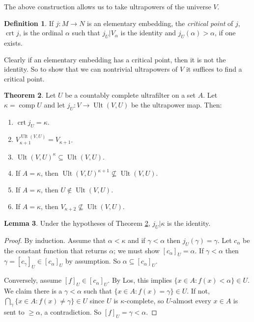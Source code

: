 \documentclass[12pt]{report}
\DeclareMathOperator{\comp}{comp}
\DeclareMathOperator{\crt}{crt}
\DeclareMathOperator{\Ult}{Ult}
\newcommand{\dfn}[1]{\emph{#1}\index{#1}}
\theoremstyle{definition}
\newtheorem{theorem}{Theorem}[chapter]
\newtheorem{lemma}[theorem]{Lemma}
\newtheorem{definition}[theorem]{Definition}
\begin{document}
The above construction allows us to take ultrapowers of the universe $V$.
\begin{definition}
If $j: M \to N$ is an elementary embedding, the \dfn{critical point} of $j$, $\crt j$, is the ordinal $\alpha$ such that $j_U|V_\alpha$ is the identity and $j_U(\alpha) > \alpha$, if one exists.
\end{definition}
Clearly if an elementary embedding has a critical point, then it is not the identity. So to show that we can nontrivial ultrapowers of $V$ it suffices to find a critical point.
\begin{theorem}
\label{critical point is a measurable cardinal}
Let $U$ be a countably complete ultrafilter on a set $A$. Let $\kappa = \comp U$ and let $j_U: V \to \Ult(V, U)$ be the ultrapower map. Then:
\begin{enumerate}
\item $\crt j_U = \kappa$.
\item $V_{\kappa + 1}^{\Ult(V, U)} = V_{\kappa + 1}$.
\item $\Ult(V, U)^\kappa \subseteq \Ult(V, U)$.
\item If $A = \kappa$, then $\Ult(V, U)^{\kappa + 1} \not \subseteq \Ult(V, U)$.
\item If $A = \kappa$, then $U \notin \Ult(V, U)$.
\item If $A = \kappa$, then $V_{\kappa + 2} \not \subseteq \Ult(V, U)$.
\end{enumerate}
\end{theorem}
\begin{lemma}
Under the hypotheses of Theorem \ref{critical point is a measurable cardinal}, $j_U|\kappa$ is the identity.
\end{lemma}
\begin{proof}
By induction. Assume that $\alpha < \kappa$ and if $\gamma < \alpha$ then $j_U(\gamma) = \gamma$. Let $c_\alpha$ be the constant function that returns $\alpha$; we must show $[c_\alpha]_U = \alpha$. If $\gamma < \alpha$ then $\gamma = [c_\gamma]_U \in [c_\alpha]_U$ by assumption. So $\alpha \subseteq [c_\alpha]_U$.

Conversely, assume $[f]_U \in [c_\alpha]_U$. By Los, this implies $\{x \in A: f(x) < \alpha\} \in U$. We claim there is a $\gamma < \alpha$ such that $\{x \in A: f(x) = \gamma\} \in U$.
If not, $\bigcap_\gamma \{x \in A: f(x) \neq \gamma\} \in U$ since $U$ is $\kappa$-complete, so $U$-almost every $x \in A$ is sent to $\geq \alpha$, a contradiction. So $[f]_U = \gamma < \alpha$.
\end{proof}
\end{document}
